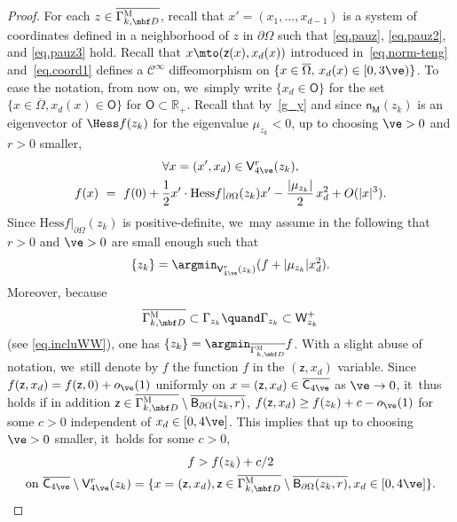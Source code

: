 \begin{proof}
For each $z\in \overline{ \Gamma_{k,\mbf D}^{\textsc{M}}}$, recall
that $x'=(x_1,\ldots,x_{d-1})$ is a system of coordinates defined
in a neighborhood of $z$ in $\partial \Omega$ such that
\eqref{eq.pauz}, \eqref{eq.pauz2}, and \eqref{eq.pauz3} hold. Recall
that $x\mto (\mathsf z(x),x_d(x))$ introduced
in~\eqref{eq.norm-teng} and~\eqref{eq.coord1} defines a $\mathcal C^\infty$ diffeomorphism on $\{x\in\overline\Omega,\, x_d(x)\in [0,3\ve)\}$. To ease the notation, from now on, we~simply write $\{ x_d \in \mathsf O\}$ for the set $\{x\in \overline \Omega, x_d(x) \in \mathsf O\}$ for $\mathsf O\subset \mathbb R_+$.
Recall that by~\eqref{g_y} and since $\mathsf n_{\mathsf M}(z_k)$ is an eigenvector of $\Hess f(z_k)$ for the eigenvalue $\mu_{z_k}<0$,
up to choosing $\ve>0$ and $r>0$ smaller,\vspace*{-4pt}
\begin{multline}\label{eq.DLzk}
\forall x=(x',x_d)\in \mathsf V_{4\ve}^r(z_k), \\ f(x)\ =\ f(0)+ \frac 12 x' \cdot \text{Hess} f|_{\partial \Omega} (z_k)x' - \frac{\vert \mu_{z_k}\vert }{2}\, x_d^2 + O(\vert x\vert^3).
\end{multline}
Since $\text{Hess} f|_{\partial \Omega} (z_k)$ is positive-definite, we~may assume in the following that $r>0$ and $\ve>0$ are small enough such that\vspace*{-3pt}
\begin{equation}\label{eq.min-zK}
\{z_k\}=\argmin_{ { \mathsf V_{4\ve}^r(z_k)}} (f+ \vert \mu_{z_k} \vert x_d^2).
\end{equation}
Moreover, because\vspace*{-4pt}
\[
\overline{ \Gamma_{k,\mbf D}^{\textsc{M}}}\subset \Gamma_{z_k}\quand \Gamma_{z_k}\subset \mathsf W_{z_k}^+
\]
(see \eqref{eq.incluWW}), one has
$\{z_k\}=\argmin_{\overline{ \Gamma_{k,\mbf D}^{\textsc{M}}}}f$.
With a slight abuse of notation, we~still denote by $f$ the function $f$ in the $(\mathsf z,x_d)$ variable.
Since $f(\mathsf z,x_d)= f(\mathsf z,0)+o_{\ve}(1)$ uniformly on $x=(\mathsf z,x_d)\in \overline{\mathsf C_{4\ve}}$ as $\ve \to 0$, it~thus holds if in addition $\mathsf z\in \overline{ \Gamma_{k,\mbf D}^{\textsc{M}}}\setminus \overline{\mathsf B_{\partial \Omega}(z_k,r)}$, $f(\mathsf z,x_d)\ge f(z_k)+c-o_{\ve}(1)$ for some $c>0$ independent of $x_d\in [0,4\ve]$. This implies that up to choosing $\ve >0$ smaller, it~holds for some $c>0$,
\begin{multline}\label{eq.min>>zK}
f> f(z_k)+c/2\\ \text{on}\ \overline{\mathsf C_{4\ve}}\setminus \mathsf V_{4\ve}^r(z_k)=\{x=(\mathsf z,x_d), \mathsf z\in \overline{ \Gamma_{k,\mbf D}^{\textsc{M}}}\setminus \overline{\mathsf B_{\partial \Omega}(z_k,r)}, x_d\in [0,4\ve]\}.
\end{multline}


\end{proof}
